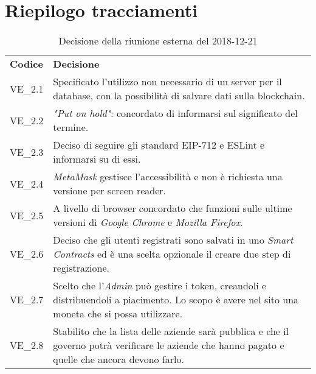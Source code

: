 \section{Riepilogo tracciamenti}
\begin{table}[H]
	
	\begin{longtable}{ >{\centering}p{} >{\centering}p{}}
			
		\rowcolorhead
		\centering \textbf{\color{white}Codice} 
		& \centering \textbf{\color{white}Decisione} 
		
		\tabularnewline 
		VE\_2.1 & Specificato l'utilizzo non necessario di un server per il database,
				con la possibilità di salvare dati sulla blockchain.
		
		\tabularnewline 
		VE\_2.2 & \textit{"Put on hold"}: concordato di informarsi sul significato del termine.
		
		\tabularnewline 
		VE\_2.3 & Deciso di seguire gli standard EIP-712 e ESLint e informarsi su di essi.
	
		\tabularnewline 
		VE\_2.4 & \textit{MetaMask} gestisce l'accessibilità e non è richiesta una versione
				per screen reader\glo{}.
		
		\tabularnewline 
		VE\_2.5 & A livello di browser concordato che funzioni sulle ultime versioni 
				di \textit{Google Chrome} e \textit{Mozilla Firefox}.
		
		\tabularnewline 
		VE\_2.6 & Deciso che gli utenti registrati sono salvati in uno \textit{Smart 
				Contracts} ed è una scelta opzionale il creare due step di registrazione.
				
		\tabularnewline
		VE\_2.7 & Scelto che l'\textit{Admin} può gestire i token\glo{}, creandoli 
				e distribuendoli a piacimento. Lo scopo è avere nel sito una moneta che si 
				possa utilizzare.
				
		\tabularnewline
		VE\_2.8 & Stabilito che la lista delle aziende sarà pubblica e che il governo potrà 
				verificare le aziende che hanno pagato e quelle che ancora devono farlo.
		
	\end{longtable}
	\caption{Decisione della riunione esterna del 2018-12-21}	

\end{table}
